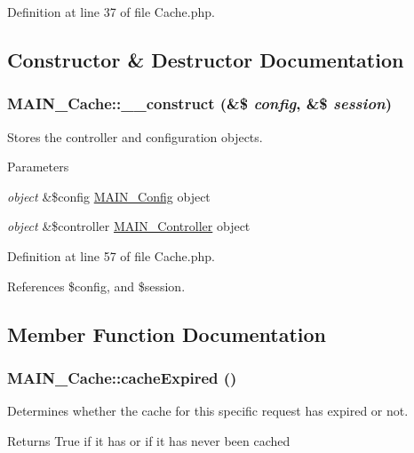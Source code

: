 Definition at line 37 of file Cache.php.

\subsection{Constructor \& Destructor Documentation}
\hypertarget{classMAIN__Cache_acf1b5cb6aadded08ca6e99c026ccb002}{
\subsubsection[{\_\-\_\-construct}]{\setlength{\rightskip}{0pt plus 5cm}MAIN\_\-Cache::\_\-\_\-construct (\&\$ {\em config}, \/  \&\$ {\em session})}}
\label{d2/d41/classMAIN__Cache_acf1b5cb6aadded08ca6e99c026ccb002}
Stores the controller and configuration objects.


\begin{DoxyParams}{Parameters}
\item[{\em object}]\&\$config \hyperlink{classMAIN__Config}{MAIN\_\-Config} object \item[{\em object}]\&\$controller \hyperlink{classMAIN__Controller}{MAIN\_\-Controller} object \end{DoxyParams}


Definition at line 57 of file Cache.php.

References \$config, and \$session.

\subsection{Member Function Documentation}
\hypertarget{classMAIN__Cache_a217d6d4359eeb584a532364b9edbba87}{
\subsubsection[{cacheExpired}]{\setlength{\rightskip}{0pt plus 5cm}MAIN\_\-Cache::cacheExpired ()}}
\label{d2/d41/classMAIN__Cache_a217d6d4359eeb584a532364b9edbba87}
Determines whether the cache for this specific request has expired or not.

\begin{DoxyReturn}{Returns}
True if it has or if it has never been cached 
\end{DoxyReturn}


